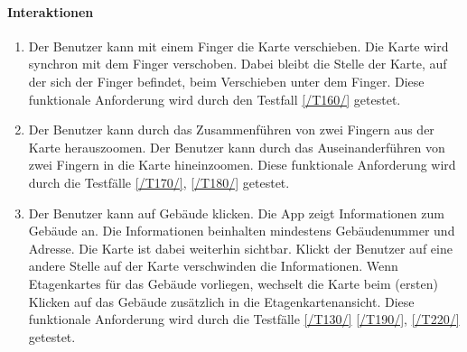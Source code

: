 \paragraph{Interaktionen}
\begin{enumerate}[start=12, label=\textbf{/FA\arabic*/}, align=left]
    \item \label{/FA12/} Der \Gls{Benutzer} kann mit einem Finger die \Gls{Karte} verschieben. Die \Gls{Karte} wird synchron mit dem Finger verschoben. Dabei bleibt die Stelle der \Gls{Karte}, auf der sich der Finger befindet, beim Verschieben unter dem Finger. Diese funktionale Anforderung wird durch den Testfall \ref{/T160/} getestet.
    \item \label{/FA13/} Der \Gls{Benutzer} kann durch das Zusammenführen von zwei Fingern aus der \Gls{Karte} herauszoomen. Der \Gls{Benutzer} kann durch das Auseinanderführen von zwei Fingern in die \Gls{Karte} hineinzoomen. Diese funktionale Anforderung wird durch die Testfälle \ref{/T170/}, \ref{/T180/} getestet.
    \item \label{/FA14/} Der \Gls{Benutzer} kann auf Gebäude klicken. Die App zeigt Informationen zum Gebäude an. Die Informationen beinhalten mindestens Gebäudenummer und Adresse. Die \Gls{Karte} ist dabei weiterhin sichtbar. Klickt der \Gls{Benutzer} auf eine andere Stelle auf der \Gls{Karte} verschwinden die Informationen. Wenn \Glspl{Etagenkarte} für das Gebäude vorliegen, wechselt die \Gls{Karte} beim (ersten) Klicken auf das Gebäude zusätzlich in die \Gls{Etagenkartenansicht}. Diese funktionale Anforderung wird durch die Testfälle \ref{/T130/} \ref{/T190/}, \ref{/T220/} getestet.
\end{enumerate}